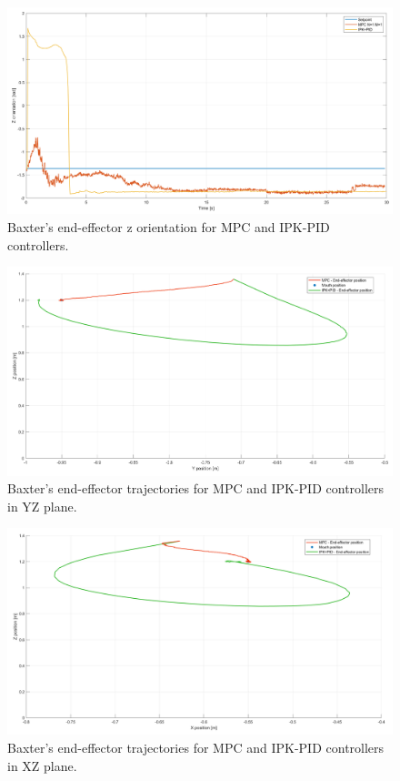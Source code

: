 \documentclass[11pt]{report} %
\begin{document}
\begin{figure}[H]
    \centering
    \includegraphics[width=1.0\linewidth]{assets/imgs/control_theory/mpc_vs_pid/z_orientation.png}
    \caption{Baxter's end-effector z orientation for MPC and IPK-PID controllers.} 
    \label{fig_baxter_z_orientation_mpc_pid_experiments}
\end{figure}

\begin{figure}[H]
    \centering
    \includegraphics[width=1.0\linewidth]{assets/imgs/control_theory/mpc_vs_pid/yz_view.png}
    \caption{Baxter's end-effector trajectories for MPC and IPK-PID controllers in YZ plane.} 
    \label{fig_yz_view_mpc_pid_experiments}
\end{figure}

\begin{figure}[H]
    \centering
    \includegraphics[width=1.0\linewidth]{assets/imgs/control_theory/mpc_vs_pid/xz_view.png}
    \caption{Baxter's end-effector trajectories for MPC and IPK-PID controllers in XZ plane.} 
    \label{fig_xz_view_mpc_pid_experiments}
\end{figure}
\end{document}
